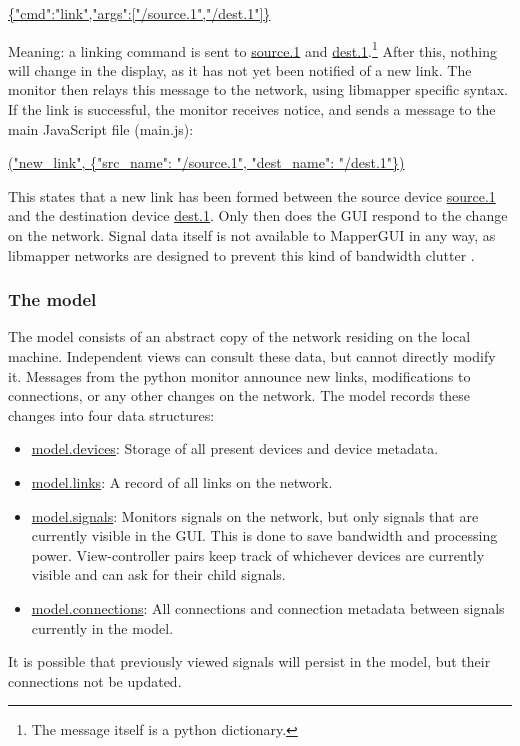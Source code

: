 \url{ {"cmd":"link","args":["/source.1","/dest.1"]} }

Meaning: a linking command is sent to \url{source.1} and \url{dest.1}.\footnote{The message itself is a python dictionary.} After this, nothing will change in the display, as it has not yet been notified of a new link. The monitor then relays this message to the network, using libmapper specific syntax. If the link is successful, the monitor receives notice, and sends a message to the main JavaScript file (main.js):

\url{("new_link", {"src_name": "/source.1", "dest_name": "/dest.1"}) }

This states that a new link has been formed between the source device \url{source.1} and the destination device \url{dest.1}. Only then does the GUI respond to the change on the network. Signal data itself is not available to MapperGUI in any way, as libmapper networks are designed to prevent this kind of bandwidth clutter .

		\subsubsection{The model}

The model consists of an abstract copy of the network residing on the local machine. Independent views can consult these data, but cannot directly modify it. Messages from the python monitor announce new links, modifications to connections, or any other changes on the network. The model records these changes into four data structures:

\begin{itemize}
 	\item \url{model.devices}: Storage of all present devices and device metadata.
 	\item \url{model.links}: A record of all links on the network.
 	\item \url{model.signals}: Monitors signals on the network, but only signals that are currently visible in the GUI. This is done to save bandwidth and processing power. View-controller pairs keep track of whichever devices are currently visible and can ask for their child signals. 
 	\item \url{model.connections}: All connections and connection metadata between signals currently in the model.
 \end{itemize} 

It is possible that previously viewed signals will persist in the model, but their connections not be updated.


